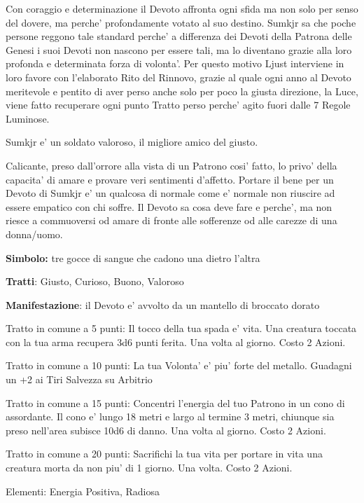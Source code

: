 \documentclass[a4paper,11pt,twoside,openany]{book}
\begin{document}
{		Con coraggio e determinazione il Devoto affronta ogni sfida ma non solo per senso del dovere, ma perche' profondamente votato al suo destino. Sumkjr sa che poche persone reggono tale standard perche' a differenza dei Devoti della Patrona delle Genesi i suoi Devoti non nascono per essere tali, ma lo diventano grazie alla loro profonda e determinata forza di volonta'. Per questo motivo Ljust interviene in loro favore con l'elaborato Rito del Rinnovo, grazie al quale ogni anno al Devoto meritevole e pentito di aver perso anche solo per poco la giusta direzione, la Luce, viene fatto recuperare ogni punto Tratto perso perche' agito fuori dalle 7 Regole Luminose.
		
		Sumkjr e' un soldato valoroso, il migliore amico del giusto.
		
		Calicante, preso dall'orrore alla vista di un Patrono cosi' fatto, lo privo' della capacita' di amare e provare veri sentimenti d'affetto. Portare il bene per un Devoto di Sumkjr e' un qualcosa di normale come e' normale non riuscire ad essere empatico con chi soffre. Il Devoto sa cosa deve fare e perche', ma non riesce a commuoversi od amare di fronte alle sofferenze od alle carezze di una donna/uomo.
		
		\textbf{Simbolo:} tre gocce di sangue che cadono una dietro l'altra
		
		\textbf{Tratti}: Giusto, Curioso, Buono, Valoroso
		
		\textbf{Manifestazione}: il Devoto e' avvolto da un mantello di broccato dorato
		
		\bigskip
		
		Tratto in comune a 5 punti: Il tocco della tua spada e’ vita. Una creatura toccata con la tua arma recupera 3d6 punti ferita. Una volta al giorno. Costo 2 Azioni. 
		
		Tratto in comune a 10 punti: La tua Volonta’ e’ piu’ forte del metallo. Guadagni un +2 ai Tiri Salvezza su Arbitrio
		
		Tratto in comune a 15 punti: Concentri l’energia del tuo Patrono in un cono di assordante. Il cono e’ lungo 18 metri e largo al termine 3 metri, chiunque sia preso nell’area subisce 10d6 di danno. 
		Una volta al giorno. Costo 2 Azioni.
		
		Tratto in comune a 20 punti: Sacrifichi la tua vita per portare in vita una creatura morta da non piu’ di 1 giorno. Una volta. Costo 2 Azioni.
		
		\bigskip
		
		Elementi: Energia Positiva, Radiosa
		
}
\end{document}
